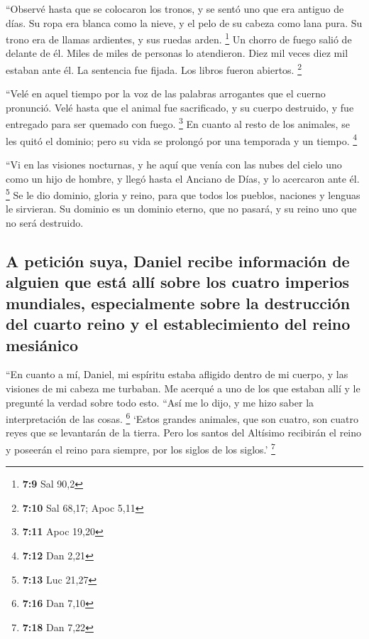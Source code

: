  ``Observé hasta que se colocaron los tronos, y se sentó
uno que era antiguo de días. Su ropa era blanca como la nieve, y el pelo
de su cabeza como lana pura. Su trono era de llamas ardientes, y sus
ruedas arden. \footnote{\textbf{7:9} Sal 90,2}  Un chorro
de fuego salió de delante de él. Miles de miles de personas lo
atendieron. Diez mil veces diez mil estaban ante él. La sentencia fue
fijada. Los libros fueron abiertos. \footnote{\textbf{7:10} Sal 68,17;
  Apoc 5,11}

 ``Velé en aquel tiempo por la voz de las palabras
arrogantes que el cuerno pronunció. Velé hasta que el animal fue
sacrificado, y su cuerpo destruido, y fue entregado para ser quemado con
fuego. \footnote{\textbf{7:11} Apoc 19,20}  En cuanto al
resto de los animales, se les quitó el dominio; pero su vida se prolongó
por una temporada y un tiempo. \footnote{\textbf{7:12} Dan 2,21}

 ``Vi en las visiones nocturnas, y he aquí que venía con
las nubes del cielo uno como un hijo de hombre, y llegó hasta el Anciano
de Días, y lo acercaron ante él. \footnote{\textbf{7:13} Luc 21,27}
 Se le dio dominio, gloria y reino, para que todos los
pueblos, naciones y lenguas le sirvieran. Su dominio es un dominio
eterno, que no pasará, y su reino uno que no será destruido.

\hypertarget{a-peticiuxf3n-suya-daniel-recibe-informaciuxf3n-de-alguien-que-estuxe1-alluxed-sobre-los-cuatro-imperios-mundiales-especialmente-sobre-la-destrucciuxf3n-del-cuarto-reino-y-el-establecimiento-del-reino-mesiuxe1nico}{%
\subsection{A petición suya, Daniel recibe información de alguien que
está allí sobre los cuatro imperios mundiales, especialmente sobre la
destrucción del cuarto reino y el establecimiento del reino
mesiánico}\label{a-peticiuxf3n-suya-daniel-recibe-informaciuxf3n-de-alguien-que-estuxe1-alluxed-sobre-los-cuatro-imperios-mundiales-especialmente-sobre-la-destrucciuxf3n-del-cuarto-reino-y-el-establecimiento-del-reino-mesiuxe1nico}}

 ``En cuanto a mí, Daniel, mi espíritu estaba afligido
dentro de mi cuerpo, y las visiones de mi cabeza me turbaban.
 Me acerqué a uno de los que estaban allí y le pregunté
la verdad sobre todo esto. ``Así me lo dijo, y me hizo saber la
interpretación de las cosas. \footnote{\textbf{7:16} Dan 7,10}
 `Estos grandes animales, que son cuatro, son cuatro
reyes que se levantarán de la tierra.  Pero los santos
del Altísimo recibirán el reino y poseerán el reino para siempre, por
los siglos de los siglos.' \footnote{\textbf{7:18} Dan 7,22}


